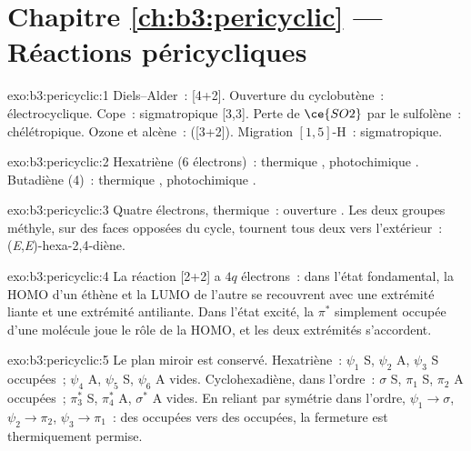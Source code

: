 \section*{Chapitre \ref{ch:b3:pericyclic} --- Réactions péricycliques}

\begin{solution}{exo:b3:pericyclic:1}
Diels--Alder~:  [4+2]. Ouverture du cyclobutène~:
électrocyclique. Cope~: sigmatropique [3,3]. Perte de $\ce{SO2}$ par le sulfolène~: chélétropique. Ozone et alcène~:  ([3+2]). Migration $[1,5]$-H~: sigmatropique.
\end{solution}

\begin{solution}{exo:b3:pericyclic:2}
Hexatriène (6 électrons)~: thermique , photochimique
. Butadiène (4)~: thermique , photochimique
.
\end{solution}

\begin{solution}{exo:b3:pericyclic:3}
Quatre électrons, thermique~: ouverture . Les deux groupes
méthyle, sur des faces opposées du cycle, tournent tous deux vers
l'extérieur~: (\textit{E},\textit{E})-hexa-2,4-diène.
\end{solution}

\begin{solution}{exo:b3:pericyclic:4}
La réaction [2+2]  a $4q$ électrons~: dans l'état fondamental, la HOMO d'un
éthène et la LUMO de l'autre se recouvrent avec une extrémité liante et une
extrémité antiliante. Dans l'état excité, la $\pi^*$ simplement occupée d'une molécule joue le rôle de la
HOMO, et les deux extrémités s'accordent.
\end{solution}

\begin{solution}{exo:b3:pericyclic:5}
Le plan miroir est conservé. Hexatriène~: $\psi_1$ S, $\psi_2$ A, $\psi_3$ S occupées~; $\psi_4$ A, $\psi_5$ S, $\psi_6$ A vides.
Cyclohexadiène, dans l'ordre~: $\sigma$ S, $\pi_1$ S, $\pi_2$ A occupées~; $\pi_3^*$ S, $\pi_4^*$ A, $\sigma^*$ A vides. En reliant par
symétrie dans l'ordre, $\psi_1 \to \sigma$, $\psi_2 \to \pi_2$, $\psi_3 \to \pi_1$~: des occupées vers des occupées, la fermeture 
est thermiquement permise.
\end{solution}

